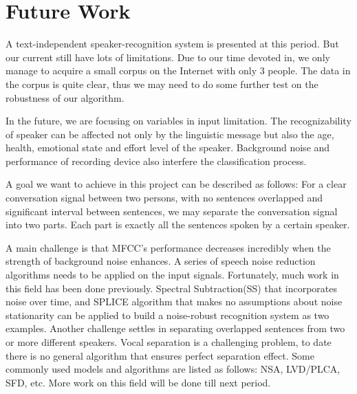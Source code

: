 \section{Future Work}

A text-independent speaker-recognition system is presented at this period.
But our current still have lots of limitations.
Due to our time devoted in, we only manage to acquire a small corpus on the Internet with only 3 people.
The data in the corpus is quite clear, thus we may need to do some further test on the robustness of our
algorithm.

In the future, we are focusing on variables in input limitation. The
recognizability of speaker can be affected not only by the linguistic message
but also the age, health, emotional state and effort level of the speaker.
Background noise and performance of recording device also interfere the
classification process.

A goal we want to achieve in this project can be described as follows: For a clear conversation signal between two persons, with no sentences
overlapped and significant interval between sentences, we may separate the conversation signal into two parts. Each part is exactly all the sentences
spoken by a certain speaker.

A main challenge is that MFCC's performance decreases incredibly when the strength of background noise enhances.  A series of speech noise reduction
algorithms needs to be applied on the input signals. Fortunately, much work in this field has been done previously. Spectral Subtraction(SS) that
incorporates noise over time, and SPLICE algorithm that makes no assumptions about noise stationarity can be applied to build a noise-robust
recognition system as two examples.
Another challenge settles in separating overlapped sentences from two or more different speakers.
Vocal separation is a challenging problem, to date
there is no general algorithm that ensures perfect separation effect.
Some commonly used models and algorithms are listed as follows: NSA, LVD/PLCA,
SFD, etc. More work on this field will be done till next period.

